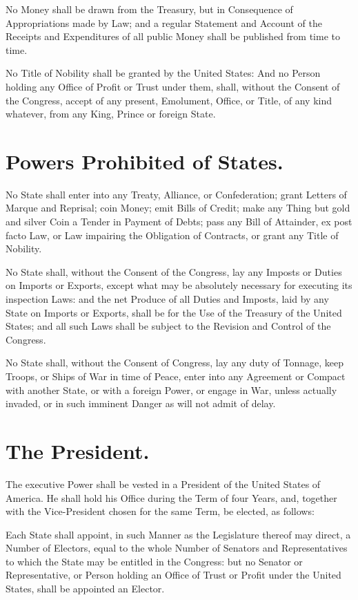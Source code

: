 \documentclass[12pt]{constitution}
\begin{document}
No Money shall be drawn from the Treasury, but in Consequence of Appropriations
made by Law; and a regular Statement and Account of the Receipts and
Expenditures of all public Money shall be published from time to time.

No Title of Nobility shall be granted by the United States: And no Person
holding any Office of Profit or Trust under them, shall, without the Consent of
the Congress, accept of any present, Emolument, Office, or Title, of any kind
whatever, from any King, Prince or foreign State.


\section{Powers Prohibited of States.}
No State shall enter into any Treaty, Alliance, or Confederation; grant Letters
of Marque and Reprisal; coin Money; emit Bills of Credit; make any Thing but
gold and silver Coin a Tender in Payment of Debts; pass any Bill of Attainder,
ex post facto Law, or Law impairing the Obligation of Contracts, or grant any
Title of Nobility.

No State shall, without the Consent of the Congress, lay any Imposts or Duties
on Imports or Exports, except what may be absolutely necessary for executing
its inspection Laws: and the net Produce of all Duties and Imposts, laid by
any State on Imports or Exports, shall be for the Use of the Treasury of the
United States; and all such Laws shall be subject to the Revision and Control
of the Congress.

No State shall, without the Consent of Congress, lay any duty of Tonnage, keep
Troops, or Ships of War in time of Peace, enter into any Agreement or Compact
with another State, or with a foreign Power, or engage in War, unless actually
invaded, or in such imminent Danger as will not admit of delay.



\section{The President.}
The executive Power shall be vested in a President of the United States of
America. He shall hold his Office during the Term of four Years, and, together
with the Vice-President chosen for the same Term, be elected, as follows:

Each State shall appoint, in such Manner as the Legislature thereof may direct,
a Number of Electors, equal to the whole Number of Senators and Representatives
to which the State may be entitled in the Congress: but no Senator or
Representative, or Person holding an Office of Trust or Profit under the United
States, shall be appointed an Elector.
\end{document}
